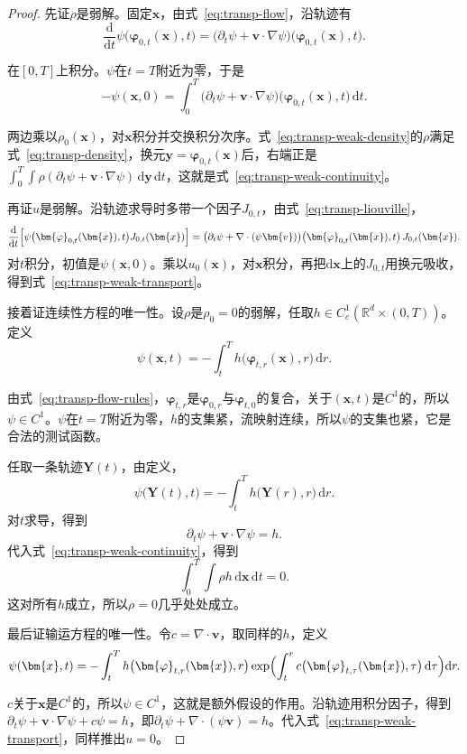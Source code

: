 \begin{proof}
先证$\rho$是弱解。固定$\bm{x}$，由式~\eqref{eq:transp-flow}，沿轨迹有
\[
  \frac{\mathrm{d}}{\mathrm{d}t}\psi\bigl(\bm{\varphi}_{0,t}(\bm{x}),t\bigr)
  =\bigl(\partial_t\psi+\bm{v}\cdot\nabla\psi\bigr)\bigl(\bm{\varphi}_{0,t}(\bm{x}),t\bigr).
\]

在$[0,T]$上积分。$\psi$在$t=T$附近为零，于是
\[
  -\psi(\bm{x},0)=\int_0^{T}\bigl(\partial_t\psi+\bm{v}\cdot\nabla\psi\bigr)\bigl(\bm{\varphi}_{0,t}(\bm{x}),t\bigr)\,\mathrm{d}t.
\]

两边乘以$\rho_0(\bm{x})$，对$\bm{x}$积分并交换积分次序。式~\eqref{eq:transp-weak-density}的$\rho$满足式~\eqref{eq:transp-density}，换元$\bm{y}=\bm{\varphi}_{0,t}(\bm{x})$后，右端正是$\int_0^{T}\!\int\rho(\partial_t\psi+\bm{v}\cdot\nabla\psi)\,\mathrm{d}\bm{y}\,\mathrm{d}t$，这就是式~\eqref{eq:transp-weak-continuity}。

再证$u$是弱解。沿轨迹求导时多带一个因子$J_{0,t}$，由式~\eqref{eq:transp-liouville}，
\[
  \frac{\mathrm{d}}{\mathrm{d}t}\Bigl[\psi\bigl(\bm{\varphi}_{0,t}(\bm{x}),t\bigr)J_{0,t}(\bm{x})\Bigr]
  =\bigl(\partial_t\psi+\nabla\cdot(\psi\bm{v})\bigr)\bigl(\bm{\varphi}_{0,t}(\bm{x}),t\bigr)\,J_{0,t}(\bm{x}).
\]
对$t$积分，初值是$\psi(\bm{x},0)$。乘以$u_0(\bm{x})$，对$\bm{x}$积分，再把$\mathrm{d}\bm{x}$上的$J_{0,t}$用换元吸收，得到式~\eqref{eq:transp-weak-transport}。

接着证连续性方程的唯一性。设$\rho$是$\rho_0=0$的弱解，任取$h\in C^{1}_{c}(\mathbb{R}^{d}\times(0,T))$。定义
\[
  \psi(\bm{x},t)=-\int_t^{T}h\bigl(\bm{\varphi}_{t,r}(\bm{x}),r\bigr)\,\mathrm{d}r.
\]

由式~\eqref{eq:transp-flow-rules}，$\bm{\varphi}_{t,r}$是$\bm{\varphi}_{0,r}$与$\bm{\varphi}_{t,0}$的复合，关于$(\bm{x},t)$是$C^{1}$的，所以$\psi\in C^{1}$。$\psi$在$t=T$附近为零，$h$的支集紧，流映射连续，所以$\psi$的支集也紧，它是合法的测试函数。

任取一条轨迹$\bm{Y}(t)$，由定义，
\[
  \psi\bigl(\bm{Y}(t),t\bigr)=-\int_t^{T}h\bigl(\bm{Y}(r),r\bigr)\,\mathrm{d}r.
\]
对$t$求导，得到
\[
  \partial_t\psi+\bm{v}\cdot\nabla\psi=h.
\]
代入式~\eqref{eq:transp-weak-continuity}，得到
\[
  \int_0^{T}\!\!\int\rho h\,\mathrm{d}\bm{x}\,\mathrm{d}t=0.
\]
这对所有$h$成立，所以$\rho=0$几乎处处成立。

最后证输运方程的唯一性。令$c=\nabla\cdot\bm{v}$，取同样的$h$，定义
\[
  \psi(\bm{x},t)=-\int_t^{T}h\bigl(\bm{\varphi}_{t,r}(\bm{x}),r\bigr)\exp\Bigl(\int_t^{r}c\bigl(\bm{\varphi}_{t,\tau}(\bm{x}),\tau\bigr)\,\mathrm{d}\tau\Bigr)\mathrm{d}r.
\]

$c$关于$\bm{x}$是$C^{1}$的，所以$\psi\in C^{1}$，这就是额外假设的作用。沿轨迹用积分因子，得到$\partial_t\psi+\bm{v}\cdot\nabla\psi+c\psi=h$，即$\partial_t\psi+\nabla\cdot(\psi\bm{v})=h$。代入式~\eqref{eq:transp-weak-transport}，同样推出$u=0$。
\end{proof}

